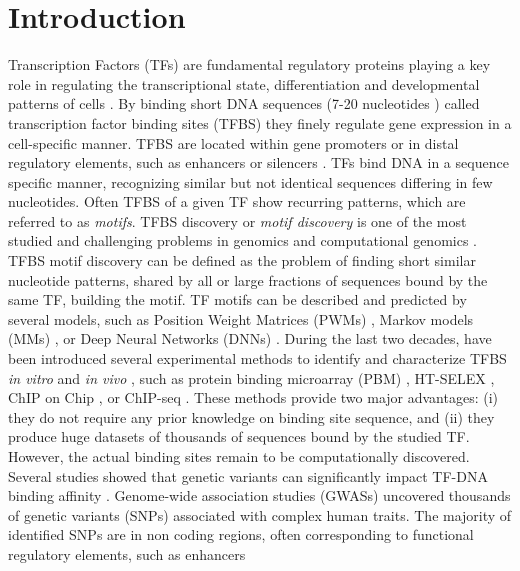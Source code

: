 \documentclass[a4paper, titlepage, openright]{book}
\newcommand{\mychapter}[2]{
    \setcounter{chapter}{#1}
    \setcounter{section}{0}
    \chapter*{#2}
    \addcontentsline{toc}{chapter}{#2}
}
\begin{document}
\begin{frontespizio}
\end{frontespizio}
\tableofcontents
\listoffigures
\listoftables
\mychapter{1}{Introduction}
Transcription Factors (TFs) are fundamental regulatory proteins playing a key role in regulating the transcriptional state, differentiation and developmental patterns of cells \citep{lambert2018human,reimold2001plasma,whyte2013master}. By binding short DNA sequences (7-20 nucleotides \citep{stewart2012transcription}) called transcription factor binding sites (TFBS) they finely regulate gene expression in a cell-specific manner. TFBS are located within gene promoters \citep{whitfield2012functional} or in distal regulatory elements, such as enhancers or silencers \citep{gotea2010homotypic,lemon2000orchestrated,nolis2009transcription}. TFs bind DNA in a sequence specific manner, recognizing similar but not identical sequences differing in few nucleotides. Often TFBS of a given TF show recurring patterns, which are referred to as \textit{motifs}. TFBS discovery or \textit{motif discovery} is one of the most studied and challenging problems in genomics and computational genomics \citep{pavesi2004silico,d2006does,zambelli2013motif}. TFBS motif discovery can be defined as the problem of finding short similar nucleotide patterns, shared by all or large fractions of sequences bound by the same TF, building the motif. TF motifs can be described and predicted by several models, such as Position Weight Matrices (PWMs) \citep{stormo2000dna}, Markov models (MMs) \citep{durbin1998biological}, or Deep Neural Networks (DNNs) \citep{talukder2021interpretation}. During the last two decades, have been introduced several experimental methods to identify and characterize TFBS \textit{in vitro} and \textit{in vivo} \citep{jolma2011methods}, such as protein binding microarray (PBM) \citep{berger2006compact,berger2009universal}, HT-SELEX \citep{jolma2010multiplexed}, ChIP on Chip \citep{pillai2015chip,collas2008chop}, or ChIP-seq \citep{johnson2007genome,mardis2007chip}. These methods provide two major advantages: (i) they do not require any prior knowledge on binding site sequence, and (ii) they produce huge datasets of thousands of sequences bound by the studied TF. However, the actual binding sites remain to be computationally discovered. Several studies showed that genetic variants can significantly impact TF-DNA binding affinity \citep{de2006regulatory,weinhold2014genome,guo2018mutation}. Genome-wide association studies (GWASs) uncovered thousands of genetic variants (SNPs) associated with complex human traits. The majority of identified SNPs are in non coding regions, often corresponding to functional regulatory elements, such as enhancers 
\end{document}
